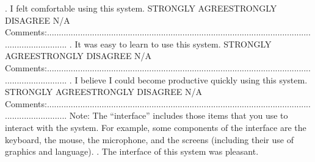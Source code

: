 \newline{}. I felt comfortable using this system.
\newline\newline
STRONGLY AGREE\tab\tab\tab\tab\tab STRONGLY DISAGREE
\newline\newline
{}\tab\tab N/A
\newline\newline
Comments:.........................................................................................................................................
\newline\newline{}. It was easy to learn to use this system.
\newline\newline
STRONGLY AGREE\tab\tab\tab\tab\tab STRONGLY DISAGREE
\newline\newline
{}\tab\tab N/A
\newline\newline
Comments:.........................................................................................................................................
\newline{}. I believe I could become productive quickly using this system.
\newline\newline
STRONGLY AGREE\tab\tab\tab\tab\tab STRONGLY DISAGREE
\newline\newline
{}\tab\tab N/A
\newline\newline
Comments:.........................................................................................................................................
\newline\newline
Note: The “interface” includes those items that you use to interact with the system. For example, some components of the interface are the keyboard, the mouse, the microphone, and the screens (including their use of graphics and language).
. The interface of this system was pleasant.
\newline\newline
